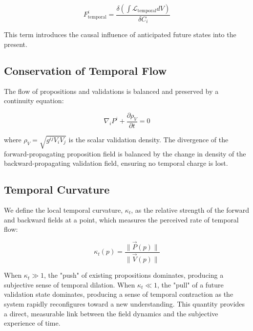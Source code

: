 \begin{equation}
F^i_{\text{temporal}} = \frac{\delta(\int \mathcal{L}_{\text{temporal}} dV)}{\delta C_i}
\end{equation}

This term introduces the causal influence of anticipated future states into the present.


\subsection{Conservation of Temporal Flow}
\label{10.5.1:conservation_of_temporal_flow}

The flow of propositions and validations is balanced and preserved by a continuity equation:

\begin{equation}
\nabla_i P^i + \frac{\partial \rho_V}{\partial t} = 0
\end{equation}

where \(\rho_V = \sqrt{g^{ij} V_{i} V_{j}}\) is the scalar validation density. The divergence of the forward-propagating proposition field is balanced by the change in density of the backward-propagating validation field, ensuring no temporal charge is lost.


\subsection{Temporal Curvature}
\label{10.5.2:temporal_curvature}

We define the local temporal curvature, \(\kappa_t\), as the relative strength of the forward and backward fields at a point, which measures the perceived rate of temporal flow:

\begin{equation}
\kappa_t(p) = \frac{\|\vec{P}(p)\|}{\|\vec{V}(p)\|}
\end{equation}

When \(\kappa_t \gg 1\), the "push" of existing propositions dominates, producing a subjective sense of temporal dilation. When \(\kappa_t \ll 1\), the "pull" of a future validation state dominates, producing a sense of temporal contraction as the system rapidly reconfigures toward a new understanding. This quantity provides a direct, measurable link between the field dynamics and the subjective experience of time. 